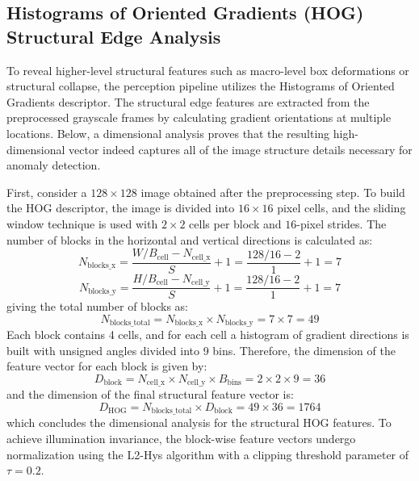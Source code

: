 \subsection{Histograms of Oriented Gradients (HOG) Structural Edge Analysis}

To reveal higher-level structural features such as macro-level box deformations or structural collapse, the perception pipeline utilizes the Histograms of Oriented Gradients descriptor. The structural edge features are extracted from the preprocessed grayscale frames by calculating gradient orientations at multiple locations. Below, a dimensional analysis proves that the resulting high-dimensional vector indeed captures all of the image structure details necessary for anomaly detection.

First, consider a $128 \times 128$ image obtained after the preprocessing step. To build the HOG descriptor, the image is divided into $16 \times 16$ pixel cells, and the sliding window technique is used with $2 \times 2$ cells per block and $16$-pixel strides. The number of blocks in the horizontal and vertical directions is calculated as:
\begin{equation}
N_{\text{blocks\_x}} = \frac{W / B_{\text{cell}} - N_{\text{cell\_x}}}{S} + 1 = \frac{128/16 - 2}{1} + 1 = 7 \label{eq:hog_blocks_x}
\end{equation}
\begin{equation}
N_{\text{blocks\_y}} = \frac{H / B_{\text{cell}} - N_{\text{cell\_y}}}{S} + 1 = \frac{128/16 - 2}{1} + 1 = 7 \label{eq:hog_blocks_y}
\end{equation}
giving the total number of blocks as:
\begin{equation}
N_{\text{blocks\_total}} = N_{\text{blocks\_x}} \times N_{\text{blocks\_y}} = 7 \times 7 = 49 \label{eq:hog_blocks_total}
\end{equation}
Each block contains 4 cells, and for each cell a histogram of gradient directions is built with unsigned angles divided into 9 bins. Therefore, the dimension of the feature vector for each block is given by:
\begin{equation}
D_{\text{block}} = N_{\text{cell\_x}} \times N_{\text{cell\_y}} \times B_{\text{bins}} = 2 \times 2 \times 9 = 36 \label{eq:hog_block_dim}
\end{equation}
and the dimension of the final structural feature vector is:
\begin{equation}
D_{\text{HOG}} = N_{\text{blocks\_total}} \times D_{\text{block}} = 49 \times 36 = 1764 \label{eq:hog_total_dim}
\end{equation}
which concludes the dimensional analysis for the structural HOG features. To achieve illumination invariance, the block-wise feature vectors undergo normalization using the L2-Hys algorithm with a clipping threshold parameter of $\tau = 0.2$.


